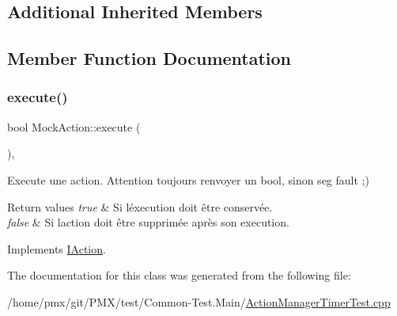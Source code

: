 \subsection*{Additional Inherited Members}


\subsection{Member Function Documentation}
\mbox{\label{classMockAction_ad7f3909b21271f52aaa5205458925b8b}} 
\subsubsection{\texorpdfstring{execute()}{execute()}}
{\footnotesize\ttfamily bool Mock\+Action\+::execute (\begin{DoxyParamCaption}{ }\end{DoxyParamCaption})\hspace{0.3cm}{\ttfamily [inline]}, {\ttfamily [virtual]}}



Execute une action. Attention toujours renvoyer un bool, sinon seg fault ;) 


\begin{DoxyRetVals}{Return values}
{\em true} & Si l\textquotesingle{}éxecution doit être conservée. \\
\hline
{\em false} & Si l\textquotesingle{}action doit être supprimée après son execution. \\
\hline
\end{DoxyRetVals}


Implements \hyperlink{classIAction_a8fabb15178fbba329f1458326c1d7c94}{I\+Action}.



The documentation for this class was generated from the following file\+:\begin{DoxyCompactItemize}
\item 
/home/pmx/git/\+P\+M\+X/test/\+Common-\/\+Test.\+Main/\hyperlink{ActionManagerTimerTest_8cpp}{Action\+Manager\+Timer\+Test.\+cpp}\end{DoxyCompactItemize}
